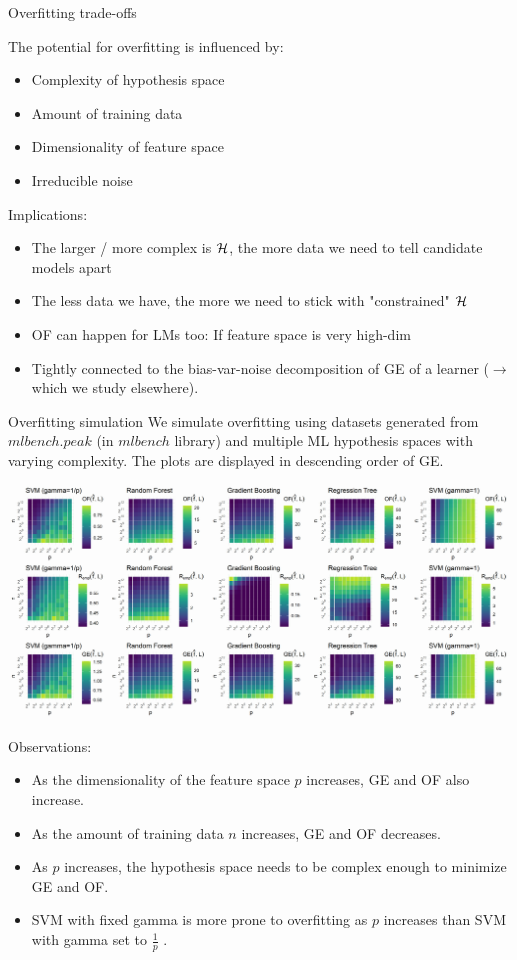\begin{vbframe}{Overfitting trade-offs}

The potential for overfitting is influenced by:
\begin{itemize}
  \item Complexity of hypothesis space
  \item Amount of training data
  \item Dimensionality of feature space
  \item Irreducible noise 
\end{itemize}
\lz
Implications:
\begin{itemize}
\item The larger / more complex is $\mathcal{H}$, 
    the more data we need to tell candidate models apart
\item The less data we have, the more we need to stick with "constrained" $\mathcal{H}$
\item OF can happen for LMs too: If feature space is very high-dim
\item Tightly connected to the bias-var-noise decomposition of GE
of a learner ($\rightarrow$ which we study elsewhere).
\end{itemize}

\end{vbframe}

\begin{vbframe}{Overfitting simulation}
We simulate overfitting using datasets generated from $mlbench.peak$ (in $mlbench$ library) and multiple ML hypothesis spaces with varying complexity. The plots are displayed in descending order of GE.
\vspace{0.5cm}

\includegraphics[width=1\textwidth]{figure/overfitting_simulation_plot.png}

\pagebreak

Observations:
\begin{itemize}
	\item As the dimensionality of the feature space $p$ increases, GE and OF also increase.
	\item As the amount of training data $n$ increases, GE and OF decreases.
	\item As $p$ increases, the hypothesis space needs to be complex enough to minimize GE and OF.
	\item SVM with fixed gamma is more prone to overfitting as $p$ increases than SVM with gamma set to $\frac{1}{p}$ .
\end{itemize}
\end{vbframe}


